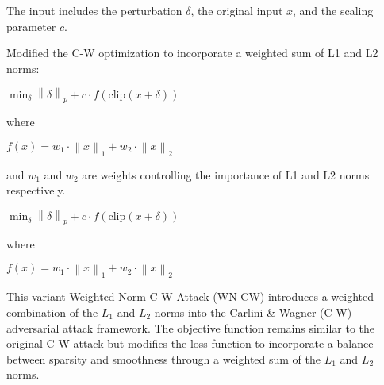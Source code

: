 The input includes the perturbation $\delta$, the original input $x$, and the scaling parameter $c$.

Modified the C-W optimization to incorporate a weighted sum of L1 and L2 norms:

$\min_{\delta} \left\| \delta \right\|_p + c \cdot f(\text{clip}(x + \delta))$

where

$f(x) = w_1 \cdot \left\| x \right\|_1 + w_2 \cdot \left\| x \right\|_2$

and $w_1$ and $w_2$ are weights controlling the importance of L1 and L2 norms respectively.

$\min_{\delta} \left\| \delta \right\|_p + c \cdot f(\text{clip}(x + \delta))$

where

$f(x) = w_1 \cdot \left\| x \right\|_1 + w_2 \cdot \left\| x \right\|_2$

This variant Weighted Norm C-W Attack (WN-CW) introduces a weighted combination of the $L_1$ and $L_2$ norms into the Carlini & Wagner (C-W) adversarial attack framework. The objective function remains similar to the original C-W attack but modifies the loss function to incorporate a balance between sparsity and smoothness through a weighted sum of the $L_1$ and $L_2$ norms.